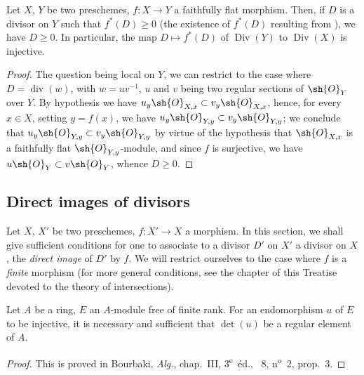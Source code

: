 \begin{proposition}[21.4.8]
\label{IV.21.4.8}
Let $X$, $Y$ be two preschemes, $f:X\to Y$ a faithfully flat morphism.
Then, if $D$ is a divisor on $Y$ such that $f^*(D)\geq 0$ (the existence of $f^*(D)$ resulting from ), we have $D\geq 0$.
In particular, the map $D\mapsto f^*(D)$ of $\operatorname{Div}(Y)$ to $\operatorname{Div}(X)$ is injective.
\end{proposition}

\begin{proof}
The question being local on $Y$, we can restrict to the case where $D=\operatorname{div}(w)$, with $w=uv^{-1}$, $u$ and $v$ being two regular sections of $\sh{O}_Y$ over $Y$.
By hypothesis we have $u_y\sh{O}_{X,x}\subset v_y\sh{O}_{X,x}$, hence, for every $x\in X$, setting $y=f(x)$, we have $u_y\sh{O}_{Y,y}\subset v_y\sh{O}_{Y,y}$;
we conclude that $u_y\sh{O}_{Y,y}\subset v_y\sh{O}_{Y,y}$ by virtue of the hypothesis that $\sh{O}_{X,x}$ is a faithfully flat $\sh{O}_{Y,y}$-module, and since $f$ is surjective, we have $u\sh{O}_Y\subset v\sh{O}_Y$, whence $D\geq 0$.
\end{proof}

\subsection{Direct images of divisors}
\label{subsection:IV.21.5}

\begin{env}[21.5.1]
\label{IV.21.5.1}
Let $X$, $X'$ be two preschemes, $f:X'\to X$ a morphism.
In this section, we shall give sufficient conditions for one to associate to a divisor $D'$ on $X'$ a divisor on $X$, the \emph{direct image} of $D'$ by $f$.
We will restrict ourselves to the case where $f$ is a \emph{finite} morphism (for more general conditions, see the chapter of this Treatise devoted to the theory of intersections).
\end{env}

\begin{lemma}[21.5.2]
\label{IV.21.5.2}
Let $A$ be a ring, $E$ an $A$-module free of finite rank.
For an endomorphism $u$ of $E$ to be injective, it is necessary and sufficient that $\det(u)$ be a regular element of $A$.
\end{lemma}

\begin{proof}
This is proved in Bourbaki, \emph{Alg.}, chap.~III, 3\textsuperscript{e}~\'{e}d., \textsection~8, n\textsuperscript{o}~2, prop.~3.
\end{proof}

